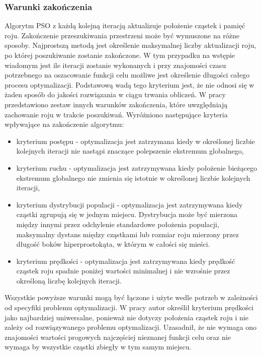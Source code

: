 \subsubsection{Warunki zakończenia}
Algorytm PSO z każdą kolejną iteracją aktualizuje położenie cząstek i pamięć roju. Zakończenie przeszukiwania przestrzeni może być wymuszone na różne sposoby. Najprostszą metodą jest określenie maksymalnej liczby aktualizacji roju, po której poszukiwanie zostanie zakończone. W tym przypadku na wstępie wiadomym jest ile iteracji zostanie wykonanych i przy znajomości czasu potrzebnego na oszacowanie funkcji celu możliwe jest określenie długości całego procesu optymalizacji. Podstawową wadą tego kryterium jest, że nie odnosi się w żaden sposób do jakości rozwiązania w ciągu trwania obliczeń. W pracy \parencite{Zielinski2007} przedstawiono zestaw innych warunków zakończenia, które uwzględniają zachowanie roju w trakcie poszukiwań. Wyróżniono następujące kryteria wpływające na zakończenie algorytmu:
\begin{itemize}
	\item kryterium postępu - optymalizacja jest zatrzymana kiedy w określonej liczbie kolejnych iteracji nie nastąpi znaczące polepszenie ekstremum globalnego,
	\item kryterium ruchu - optymalizacja jest zatrzymywana kiedy położenie bieżącego ekstremum globalnego nie zmienia się istotnie w określonej liczbie kolejnych iteracji,
	\item kryterium dystrybucji populacji - optymalizacja jest zatrzymywana kiedy cząstki zgrupują się w jednym miejscu. Dystrybucja może być mierzona między innymi przez odchylenie standardowe położenia populacji, maksymalny dystans między cząstkami lub rozmiar roju mierzony przez długość boków hiperprostokąta, w którym w całości się mieści.  
	\item kryterium prędkości - optymalizacja jest zatrzymywana kiedy prędkość cząstek roju spadnie poniżej wartości minimalnej i nie wzrośnie przez określoną liczbę kolejnych iteracji. 
\end{itemize}
Wszystkie powyższe warunki mogą być łączone i użyte wedle potrzeb w zależności od specyfiki problemu optymalizacji. W pracy \cite{Banach2017} autor określił kryterium prędkości jako najbardziej uniwersalne, ponieważ nie dotyczy położenia cząstek roju i nie zależy od rozwiązywanego problemu optymalizacji. Uzasadnił, że nie wymaga ono znajomości wartości progowych najczęściej nieznanej funkcji celu oraz nie wymaga by wszystkie cząstki zbiegły w tym samym miejscu.
